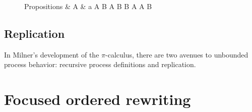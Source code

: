 \begin{figure}
\begin{syntax*}
  Propositions &
    A & a \mid {}
      \mid A \fuse B \mid \one
      \mid A \limp B \mid B \pmir A \mid A \with B \mid \top
\end{syntax*}
\end{figure}

\subsection{Replication}

In Milner's development of the $\pi$-calculus, there are two avenues to unbounded process behavior: recursive process definitions and replication.


\section{Focused ordered rewriting}

